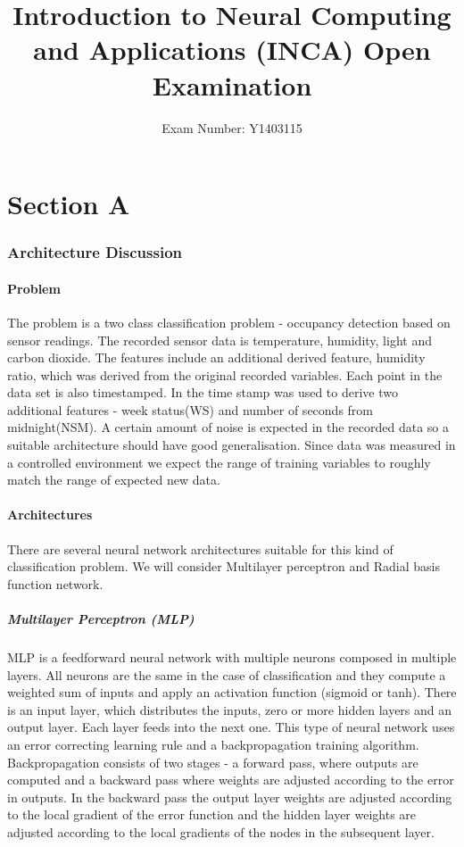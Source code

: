 \documentclass[a4paper, 11pt]{article}
\begin{document}
\title{Introduction to Neural Computing and Applications (INCA)
Open Examination}
\author{Exam Number: Y1403115}
\date{}
\maketitle


\part*{Section A}
\section{Architecture Discussion}

\subsection{Problem}
The problem is a two class classification problem - occupancy detection based on sensor readings. The recorded sensor data is temperature, humidity, light and carbon dioxide. The features include an additional derived feature, humidity ratio, which was derived from the original recorded variables. Each point in the data set is also timestamped. In \cite{Candanedo2016} the time stamp was used to derive two additional features - week status(WS) and number of seconds from midnight(NSM).
A certain amount of noise is expected in the recorded data so a suitable architecture should have good generalisation. Since data was measured in a controlled environment we expect the range of training variables to roughly match the range of expected new data.

\subsection{Architectures}
There are several neural network architectures suitable for this kind of classification problem. We will consider Multilayer perceptron and Radial basis function network. 
\subsubsection{Multilayer Perceptron (MLP)}
MLP is a feedforward neural network with multiple neurons composed in multiple layers. All neurons are the same in the case of classification and they compute a weighted sum of inputs and apply an activation function (sigmoid or tanh). There is an input layer, which distributes the inputs, zero or more hidden layers and an output layer. Each layer feeds into the next one. This type of neural network uses an error correcting learning rule and a backpropagation training algorithm. Backpropagation consists of two stages - a forward pass, where outputs are computed and a backward pass where weights are adjusted according to the error in outputs. In the backward pass the output layer weights are adjusted according to the local gradient of the error function and the hidden layer weights are adjusted according to the local gradients of the nodes in the subsequent layer. 
\end{document}
